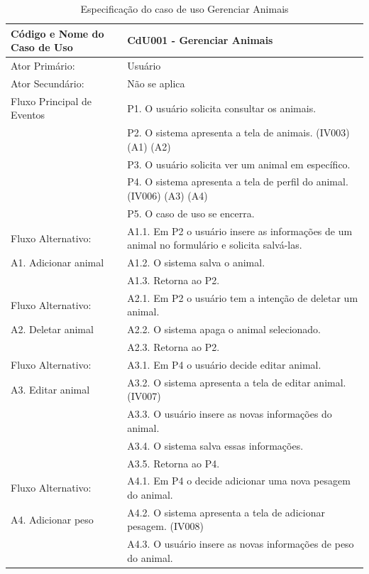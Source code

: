 \documentclass[12pt]{article}
\begin{document}
\begin{table}[!h]
	\begin{center}
		\caption{Especificação do caso de uso Gerenciar Animais}
		\begin{tabular}{ | l |  p{10cm} |}
			\hline
			Código e Nome do Caso de Uso & CdU001 - Gerenciar Animais \\ \hline
			Ator Primário: & Usuário \\ 
			Ator Secundário: & Não se aplica \\ \hline
			Fluxo Principal de Eventos & P1. O usuário solicita consultar os animais. \\
						   & P2. O sistema apresenta a tela de animais. (IV003) (A1) (A2) \\
						   & P3. O usuário solicita ver um animal em específico. \\
						   & P4. O sistema apresenta a tela de perfil do animal. (IV006) (A3) (A4)  \\
						   & P5. O caso de uso se encerra. \\ \hline
			Fluxo Alternativo:         & A1.1. Em P2 o usuário insere as informações de um animal no formulário e solicita salvá-las. \\
			A1. Adicionar animal       & A1.2. O sistema salva o animal. \\ 
						   & A1.3. Retorna ao P2. \\ \hline
			Fluxo Alternativo:         & A2.1. Em P2 o usuário tem a intenção de deletar um animal. \\
			A2. Deletar animal         & A2.2. O sistema apaga o animal selecionado. \\
						   & A2.3. Retorna ao P2. \\ \hline
			Fluxo Alternativo:         & A3.1. Em P4 o usuário decide editar animal. \\
			A3. Editar animal          & A3.2. O sistema apresenta a tela de editar animal. (IV007) \\
						   & A3.3. O usuário insere as novas informações do animal. \\
						   & A3.4. O sistema salva essas informações. \\
						   & A3.5. Retorna ao P4. \\ \hline
			Fluxo Alternativo:         & A4.1. Em P4 o decide adicionar uma nova pesagem do animal. \\
			A4. Adicionar peso         & A4.2. O sistema apresenta a tela de adicionar pesagem. (IV008) \\
						   & A4.3. O usuário insere as novas informações de peso do animal. \\

\end{tabular}
\end{center}
\end{table}
\end{document}
